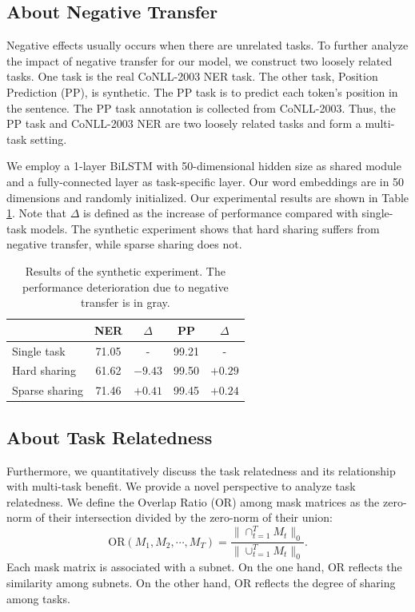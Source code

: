 \documentclass[letterpaper]{article} %
\begin{document}
\subsection{About Negative Transfer}
Negative effects usually occurs when there are unrelated tasks. To further analyze the impact of negative transfer for our model, we construct two loosely related tasks. One task is the real CoNLL-2003 NER task. The other task, Position Prediction (PP), is synthetic. The PP task is to predict each token's position in the sentence. The PP task annotation is collected from CoNLL-2003. Thus, the PP task and CoNLL-2003 NER are two loosely related tasks and form a multi-task setting.

We employ a 1-layer BiLSTM with 50-dimensional hidden size as shared module and a fully-connected layer as task-specific layer. Our word embeddings are in 50 dimensions and randomly initialized. Our experimental results are shown in Table \ref{tb:task_rel}. Note that $\Delta$ is defined as the increase of performance compared with single-task models. The synthetic experiment shows that hard sharing suffers from negative transfer, while sparse sharing does not.

\begin{table}[htbp]
\centering
\begin{tabular}{l|cc|cc}
\toprule
& NER & $\Delta$ & PP & $\Delta$ \\ \midrule
Single task & 71.05 & - & 99.21 & - \\
Hard sharing & {\cellcolor[HTML]{D6D6D6}61.62} & {\cellcolor[HTML]{D6D6D6} $-9.43$} & 99.50 & $+0.29$ \\
Sparse sharing & 71.46 & $+0.41$ & 99.45 & $+0.24$ \\ \bottomrule
\end{tabular}
\caption{Results of the synthetic experiment. The performance deterioration due to negative transfer is in gray.}
\label{tb:task_rel}
\end{table}

\subsection{About Task Relatedness}

Furthermore, we quantitatively discuss the task relatedness and its relationship with multi-task benefit. We provide a novel perspective to analyze task relatedness.
We define the Overlap Ratio (OR) among mask matrices as the zero-norm of their intersection divided by the zero-norm of their union:
\begin{equation}\label{eq:or}
\mathrm{OR}(M_1, M_2, \cdots, M_T) = \frac{\| \cap_{t=1}^TM_t\|_0}{\|\cup_{t=1}^TM_t\|_0}.
\end{equation}
Each mask matrix is associated with a subnet. On the one hand, OR reflects the similarity among subnets. On the other hand, OR reflects the degree of sharing among tasks.
\end{document}
